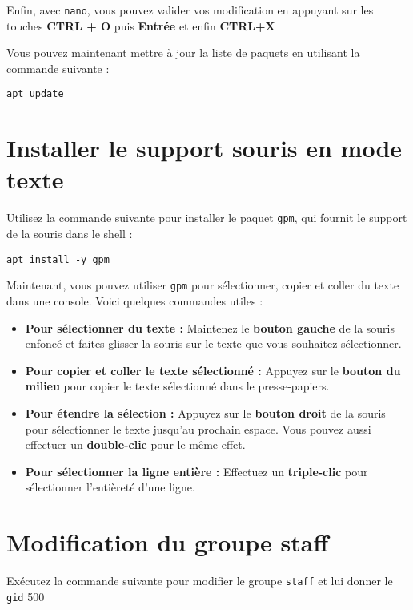 Enfin, avec \texttt{nano}, vous pouvez valider vos modification en appuyant sur les touches \textbf{CTRL + O} puis \textbf{Entrée} et enfin \textbf{CTRL+X}

Vous pouvez maintenant mettre à jour la liste de paquets en utilisant la commande suivante :

\begin{lstlisting}
apt update
\end{lstlisting}

\section{Installer le support souris en mode texte}

Utilisez la commande suivante pour installer le paquet \texttt{gpm}, qui fournit le support de la souris dans le shell :

\begin{lstlisting}
apt install -y gpm
\end{lstlisting}

Maintenant, vous pouvez utiliser \texttt{gpm} pour sélectionner, copier et coller du texte dans une console. Voici quelques commandes utiles :
\begin{itemize}
\item \textbf{Pour sélectionner du texte :} Maintenez le \textbf{bouton gauche} de la souris enfoncé et faites glisser la souris sur le texte que vous souhaitez sélectionner.
\item \textbf{Pour copier et coller le texte sélectionné :} Appuyez sur le \textbf{bouton du milieu} pour copier le texte sélectionné dans le presse-papiers.
\item \textbf{Pour étendre la sélection :} Appuyez sur le \textbf{bouton droit} de la souris pour sélectionner le texte jusqu'au prochain espace. Vous pouvez aussi effectuer un \textbf{double-clic} pour le même effet.
\item \textbf{Pour sélectionner la ligne entière :} Effectuez un \textbf{triple-clic} pour sélectionner l'entièreté d'une ligne.
\end{itemize}

\section{Modification du groupe staff}

Exécutez la commande suivante pour modifier le groupe \texttt{staff} et lui donner le \texttt{gid} 500

